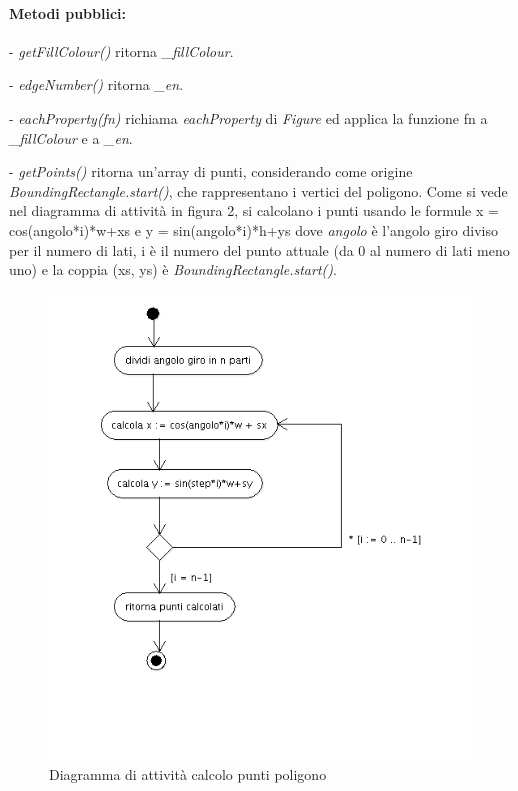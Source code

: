 \paragraph{Metodi pubblici:}
\begin{elencopuntato}[\subsubsecindent]
\item[-] \textit{getFillColour()} ritorna \textit{{\_}fillColour}.
\item[-] \textit{edgeNumber()} ritorna \textit{{\_}en}.
\item[-] \textit{eachProperty(fn)} richiama \textit{eachProperty} di \textit{Figure} ed applica la funzione fn a \textit{{\_}fillColour} e a \textit{{\_en}}.
\item[-] \textit{getPoints()} ritorna un'array di punti, considerando come origine \textit{BoundingRectangle.start()}, che rappresentano i vertici del poligono. Come si vede nel diagramma di attivit\`a in figura 2, si calcolano i punti usando le formule x = cos(angolo*i)*w+xs e y = sin(angolo*i)*h+ys dove \textit{angolo} \`e l'angolo giro diviso per il numero di lati, i \`e il numero del punto attuale (da 0 al numero di lati meno uno) e la coppia (xs, ys) \`e \textit{BoundingRectangle.start()}.

\begin{figure}[!ht]
\centering
\includegraphics[scale=0.5]{polygonpoints.png}
\caption{Diagramma di attivit\`a calcolo punti poligono}
\end{figure}


\end{elencopuntato}
